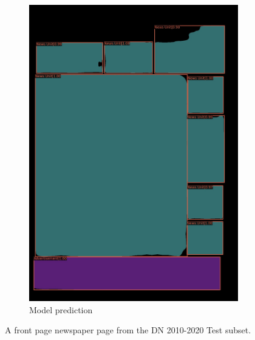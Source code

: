 \documentclass[aspectratio=1610]{beamer}
\begin{document}
\begin{frame}
\begin{figure}
\begin{subfigure}{.25\textwidth}
  \includegraphics[width=0.99\linewidth, clip=true, trim = 0mm 0mm 0mm 0mm]{figures/labels-vanilla-0.75/JIefsDa.jpg}
  \caption{Model prediction}
\end{subfigure}
\caption{A front page newspaper page from the DN 2010-2020 Test subset.}
\label{fig:front}
\end{figure}

\end{frame}
\normalpage
\end{document}
